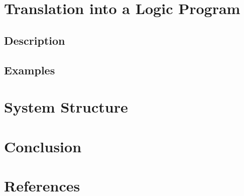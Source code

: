 \documentclass[draft]{article}
\begin{document}
  \section{Translation into a Logic Program}

    \subsection{Description}

    \subsection{Examples}

    \pagebreak

  \section{System Structure}

    \pagebreak

  \section{Conclusion}

    \pagebreak

  \section{References}
\end{document}
